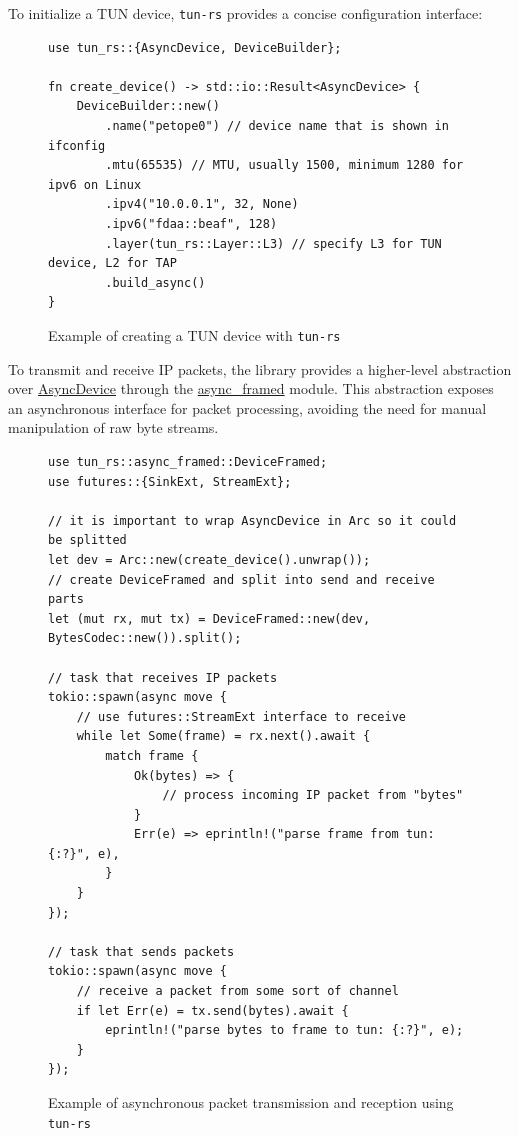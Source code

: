\documentclass[a4paper, 10pt]{article}
\begin{document}
\newpage

To initialize a TUN device, \texttt{tun-rs} provides a concise configuration interface:
\begin{figure}[H]
  \begin{verbatim}
use tun_rs::{AsyncDevice, DeviceBuilder};

fn create_device() -> std::io::Result<AsyncDevice> {
    DeviceBuilder::new()
        .name("petope0") // device name that is shown in ifconfig
        .mtu(65535) // MTU, usually 1500, minimum 1280 for ipv6 on Linux
        .ipv4("10.0.0.1", 32, None)
        .ipv6("fdaa::beaf", 128)
        .layer(tun_rs::Layer::L3) // specify L3 for TUN device, L2 for TAP
        .build_async()
}
  \end{verbatim}
  \caption{Example of creating a TUN device with \texttt{tun-rs}}
  \label{code:create_tun}
\end{figure}

To transmit and receive IP packets, the library provides a higher-level abstraction over
\href{https://docs.rs/tun-rs/2.8.3/tun_rs/struct.AsyncDevice.html}{AsyncDevice}
through the \href{https://docs.rs/tun-rs/2.8.3/tun_rs/async_framed/index.html}{async\_framed}
module. This abstraction exposes an asynchronous interface for packet processing, avoiding the need
for manual manipulation of raw byte streams.
\begin{figure}[H]
  \begin{verbatim}
use tun_rs::async_framed::DeviceFramed;
use futures::{SinkExt, StreamExt};

// it is important to wrap AsyncDevice in Arc so it could be splitted
let dev = Arc::new(create_device().unwrap());
// create DeviceFramed and split into send and receive parts
let (mut rx, mut tx) = DeviceFramed::new(dev, BytesCodec::new()).split();

// task that receives IP packets
tokio::spawn(async move {
    // use futures::StreamExt interface to receive
    while let Some(frame) = rx.next().await {
        match frame {
            Ok(bytes) => {
                // process incoming IP packet from "bytes"
            }
            Err(e) => eprintln!("parse frame from tun: {:?}", e),
        }
    }
});

// task that sends packets
tokio::spawn(async move {
    // receive a packet from some sort of channel
    if let Err(e) = tx.send(bytes).await {
        eprintln!("parse bytes to frame to tun: {:?}", e);
    }
});
  \end{verbatim}
  \caption{Example of asynchronous packet transmission and reception using \texttt{tun-rs}}
\end{figure}
\end{document}
